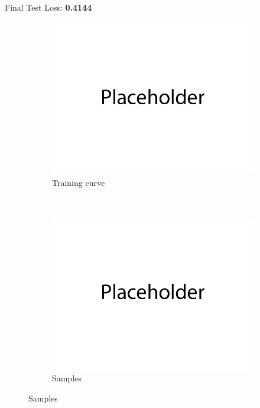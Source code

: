 \documentclass{article}
\begin{document}
Final Test Loss: \textbf{0.4144} \\
\begin{figure}[H]
    \centering
    \begin{subfigure}{0.5\textwidth}
        \centering
        \includegraphics[width=\textwidth]{figures/q1_train_plot.png}
        \caption{Training curve}
    \end{subfigure}
    \\
    \begin{subfigure}{0.5\textwidth}
        \centering
        \includegraphics[width=\textwidth]{figures/q1_samples.png}
        \caption{Samples}
    \end{subfigure}

\end{figure}
\end{document}
